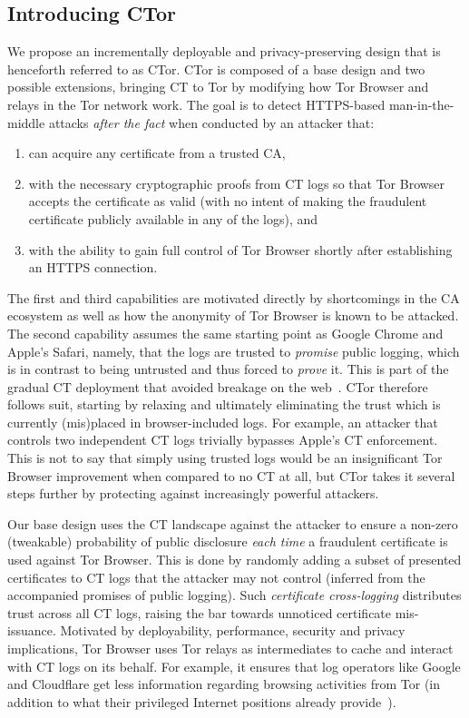 \subsection{Introducing CTor}
We propose an incrementally deployable and privacy-preserving design that is
henceforth referred to as CTor.  CTor is composed of a base design and two
possible extensions, bringing CT to Tor by modifying how Tor Browser and
relays in the Tor network work.  The goal is to detect HTTPS-based
man-in-the-middle attacks \emph{after the fact} when conducted by an attacker
that:
\begin{enumerate}
	\item can acquire any certificate from a trusted CA,
	\item with the necessary cryptographic proofs from CT logs so that
		Tor Browser accepts the certificate as valid (with no intent of making
		the fraudulent certificate publicly available in any of the logs), and
	\item with the ability to gain full control of Tor Browser shortly after
		establishing an HTTPS connection.
\end{enumerate}

The first and third capabilities are motivated directly by shortcomings in the
CA ecosystem as well as how the anonymity of Tor Browser is known to be attacked.
The second capability assumes the same starting point as Google Chrome and
Apple's Safari, namely, that the logs are trusted to \emph{promise} public
logging, which is in contrast to being untrusted and thus forced to \emph{prove}
it.  This is part of the gradual CT deployment that avoided breakage on the
web~\cite{does-ct-break-the-web}.  CTor therefore follows suit, starting
by relaxing and ultimately eliminating the trust which is currently (mis)placed
in browser-included logs.  For example, an attacker that controls two
independent CT logs trivially bypasses Apple's CT enforcement.  This is not
to say that simply using trusted logs would be an insignificant Tor Browser
improvement when compared to no CT at all, but CTor takes it several steps
further by protecting against increasingly powerful attackers.

Our base design uses the CT landscape against the attacker to ensure a non-zero
(tweakable) probability of public disclosure \emph{each time} a fraudulent
certificate is used against Tor Browser.  This is done by randomly adding a
subset of presented certificates to CT logs that the attacker may not control
(inferred from the accompanied promises of public logging).  Such
\emph{certificate cross-logging} distributes trust across all CT logs,
raising the bar towards unnoticed certificate mis-issuance.
Motivated by deployability, performance, security and privacy implications,
Tor Browser uses Tor relays as intermediates to cache and interact with CT logs
on its behalf.  For example, it ensures that log operators like Google and
Cloudflare get less information regarding browsing activities from Tor (in
addition to what their privileged Internet positions already
provide~\cite{1mtrack,TorDNS}).

